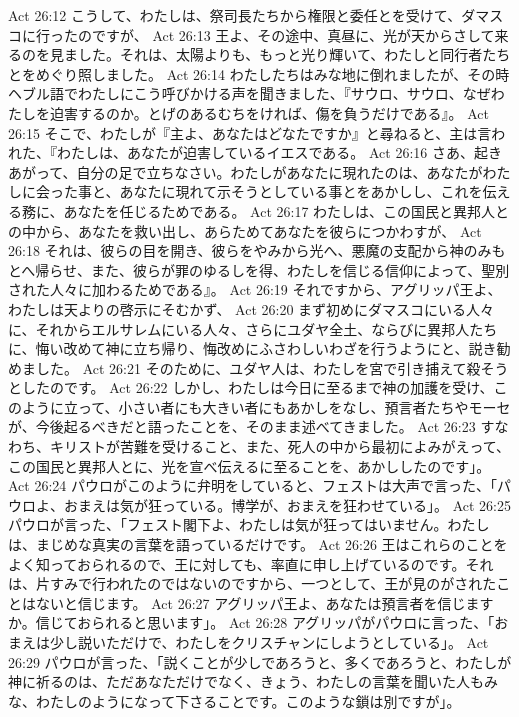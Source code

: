 Act 26:12  こうして、わたしは、祭司長たちから権限と委任とを受けて、ダマスコに行ったのですが、
Act 26:13  王よ、その途中、真昼に、光が天からさして来るのを見ました。それは、太陽よりも、もっと光り輝いて、わたしと同行者たちとをめぐり照しました。
Act 26:14  わたしたちはみな地に倒れましたが、その時ヘブル語でわたしにこう呼びかける声を聞きました、『サウロ、サウロ、なぜわたしを迫害するのか。とげのあるむちをければ、傷を負うだけである』。
Act 26:15  そこで、わたしが『主よ、あなたはどなたですか』と尋ねると、主は言われた、『わたしは、あなたが迫害しているイエスである。
Act 26:16  さあ、起きあがって、自分の足で立ちなさい。わたしがあなたに現れたのは、あなたがわたしに会った事と、あなたに現れて示そうとしている事とをあかしし、これを伝える務に、あなたを任じるためである。
Act 26:17  わたしは、この国民と異邦人との中から、あなたを救い出し、あらためてあなたを彼らにつかわすが、
Act 26:18  それは、彼らの目を開き、彼らをやみから光へ、悪魔の支配から神のみもとへ帰らせ、また、彼らが罪のゆるしを得、わたしを信じる信仰によって、聖別された人々に加わるためである』。
Act 26:19  それですから、アグリッパ王よ、わたしは天よりの啓示にそむかず、
Act 26:20  まず初めにダマスコにいる人々に、それからエルサレムにいる人々、さらにユダヤ全土、ならびに異邦人たちに、悔い改めて神に立ち帰り、悔改めにふさわしいわざを行うようにと、説き勧めました。
Act 26:21  そのために、ユダヤ人は、わたしを宮で引き捕えて殺そうとしたのです。
Act 26:22  しかし、わたしは今日に至るまで神の加護を受け、このように立って、小さい者にも大きい者にもあかしをなし、預言者たちやモーセが、今後起るべきだと語ったことを、そのまま述べてきました。
Act 26:23  すなわち、キリストが苦難を受けること、また、死人の中から最初によみがえって、この国民と異邦人とに、光を宣べ伝えるに至ることを、あかししたのです」。
Act 26:24  パウロがこのように弁明をしていると、フェストは大声で言った、「パウロよ、おまえは気が狂っている。博学が、おまえを狂わせている」。
Act 26:25  パウロが言った、「フェスト閣下よ、わたしは気が狂ってはいません。わたしは、まじめな真実の言葉を語っているだけです。
Act 26:26  王はこれらのことをよく知っておられるので、王に対しても、率直に申し上げているのです。それは、片すみで行われたのではないのですから、一つとして、王が見のがされたことはないと信じます。
Act 26:27  アグリッパ王よ、あなたは預言者を信じますか。信じておられると思います」。
Act 26:28  アグリッパがパウロに言った、「おまえは少し説いただけで、わたしをクリスチャンにしようとしている」。
Act 26:29  パウロが言った、「説くことが少しであろうと、多くであろうと、わたしが神に祈るのは、ただあなただけでなく、きょう、わたしの言葉を聞いた人もみな、わたしのようになって下さることです。このような鎖は別ですが」。
